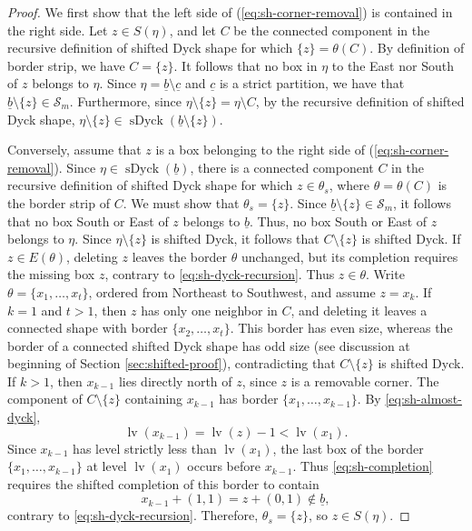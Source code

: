 \documentclass[12pt]{amsart}
\renewcommand{\b}{\underline{b}}
\theoremstyle{definition}
\numberwithin{equation}{section}
\begin{document}
\begin{proof}
We first show that the left side of (\ref{eq:sh-corner-removal}) is contained in the right side. Let $z\in S(\eta)$, and let $C$ be the connected component in the recursive definition of shifted Dyck shape for which $\{z\}=\theta(C)$. By definition of border strip, we have $C=\{z\}$. It follows that no box in $\eta$ to the East nor South of $z$ belongs to $\eta$. Since $\eta=\b\setminus \underline{c}$ and $\underline{c}$ is a strict partition, we have that $\b\setminus \{z\}\in \mathcal{S}_m$. Furthermore, since $\eta\setminus \{z\}=\eta\setminus C$, by the recursive definition of shifted Dyck shape, $\eta\setminus\{z\}\in
\operatorname{sDyck}(\b\setminus\{z\})$.

Conversely, assume that $z$ is a box belonging to the right side of (\ref{eq:sh-corner-removal}). Since $\eta\in \operatorname{sDyck}(\b)$, there is a connected component $C$ in the recursive definition of shifted Dyck shape for which $z\in \theta_s$, where $\theta=\theta(C)$ is the border strip of $C$. We must show that $\theta_s=\{z\}$. Since $\b\setminus \{z\}\in \mathcal{S}_m$, it follows that no box South or East of $z$ belongs to $\b$. Thus, no box South or East of $z$ belongs to $\eta$. Since $\eta\setminus \{z\}$ is shifted Dyck, it follows that $C\setminus \{z\}$ is shifted Dyck. If $z\in E(\theta)$, deleting $z$ leaves the
border $\theta$ unchanged, but its completion requires
the missing box $z$, contrary to
\eqref{eq:sh-dyck-recursion}. Thus $z\in \theta$. Write $\theta=\{x_1,\ldots,x_t\}$, ordered from Northeast to
Southwest, and assume $z=x_k$. If $k=1$ and $t>1$, then $z$ has only one neighbor in $C$, and
deleting it leaves a connected shape with border
$\{x_2,\ldots,x_t\}$. This border has even size, whereas
the border of a connected shifted Dyck shape has odd size (see discussion at beginning of Section \ref{sec:shifted-proof}), contradicting that $C\setminus \{z\}$ is shifted Dyck. If $k>1$, then $x_{k-1}$ lies directly north of $z$, since
$z$ is a removable corner. The component of
$C\setminus\{z\}$ containing $x_{k-1}$ has border
$\{x_1,\ldots,x_{k-1}\}$. By \eqref{eq:sh-almost-dyck},
\[
\operatorname{lv}(x_{k-1})
=\operatorname{lv}(z)-1
<\operatorname{lv}(x_1).
\]
Since $x_{k-1}$ has level strictly less than
$\operatorname{lv}(x_1)$, the last box of the border
$\{x_1,\ldots,x_{k-1}\}$ at level
$\operatorname{lv}(x_1)$ occurs before $x_{k-1}$.
Thus \eqref{eq:sh-completion} requires the shifted
completion of this border to contain
\[
x_{k-1}+(1,1)=z+(0,1)\notin\b,
\]
contrary to \eqref{eq:sh-dyck-recursion}. Therefore, $\theta_s=\{z\}$, so $z\in S(\eta)$.
\end{proof}
\end{document}
